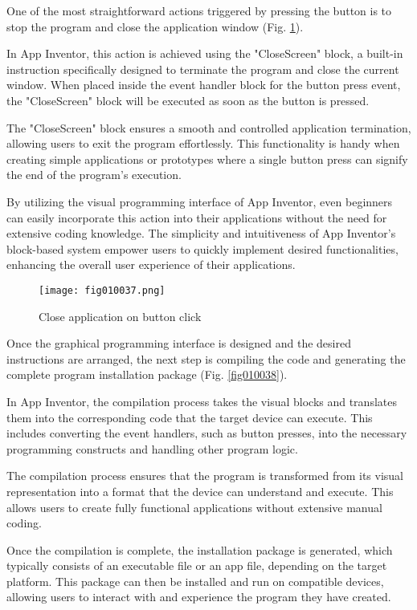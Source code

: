 One of the most straightforward actions triggered by pressing the button is to stop the program and close the application window (Fig. \ref{fig010037}).

In App Inventor, this action is achieved using the "CloseScreen" block, a built-in instruction specifically designed to terminate the program and close the current window. When placed inside the event handler block for the button press event, the "CloseScreen" block will be executed as soon as the button is pressed.

The "CloseScreen" block ensures a smooth and controlled application termination, allowing users to exit the program effortlessly. This functionality is handy when creating simple applications or prototypes where a single button press can signify the end of the program's execution.

By utilizing the visual programming interface of App Inventor, even beginners can easily incorporate this action into their applications without the need for extensive coding knowledge. The simplicity and intuitiveness of App Inventor's block-based system empower users to quickly implement desired functionalities, enhancing the overall user experience of their applications.

\begin{figure}[H]
   \centering
   \texttt{[image: fig010037.png]}
   \caption{Close application on button click}
\label{fig010037}
\end{figure}

Once the graphical programming interface is designed and the desired instructions are arranged, the next step is compiling the code and generating the complete program installation package (Fig. \ref{fig010038}).

In App Inventor, the compilation process takes the visual blocks and translates them into the corresponding code that the target device can execute. This includes converting the event handlers, such as button presses, into the necessary programming constructs and handling other program logic.

The compilation process ensures that the program is transformed from its visual representation into a format that the device can understand and execute. This allows users to create fully functional applications without extensive manual coding.

Once the compilation is complete, the installation package is generated, which typically consists of an executable file or an app file, depending on the target platform. This package can then be installed and run on compatible devices, allowing users to interact with and experience the program they have created.

